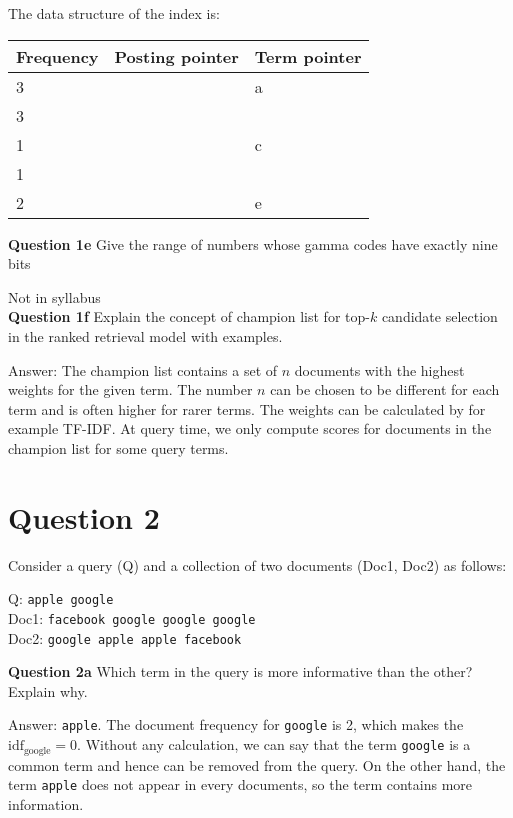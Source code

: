 \documentclass[11pt,a4paper]{report}
\begin{document}
\begin{multicols*}{2}
\noindent The data structure of the index is:

\begin{center}
\begin{tabular}{ | l | l | l |} 
    \hline
    Frequency & Posting pointer & Term pointer \\
    \hline
    3 & & a \\
    3 & & \\
    1 & & c \\
    1 & & \\
    2 & & e \\
    \hline
\end{tabular}
\end{center}

\noindent \textbf{Question 1e} Give the range of numbers whose gamma codes have exactly nine bits

\noindent Not in syllabus \\

\noindent \textbf{Question 1f} Explain the concept of champion list for top-$k$ candidate selection in the ranked retrieval model with examples. 

\noindent Answer: The champion list contains a set of $n$ documents with the highest weights for the given term. The number $n$ can be chosen to be different for each term and is often higher for rarer terms. The weights can be calculated by for example TF-IDF. At query time, we only compute scores for documents in the champion list for some query terms.

\section{Question 2}

\noindent Consider a query (Q) and a collection of two documents (Doc1, Doc2) as follows:

\begin{center}
Q: \verb|apple google|\\
Doc1: \verb|facebook google google google|\\
Doc2: \verb|google apple apple facebook|\\
\end{center}

\noindent \textbf{Question 2a} Which term in the query is more informative than the other? Explain why.

\noindent Answer: \verb|apple|. The document frequency for \verb|google| is 2, which makes the $\text{idf}_{\text{google}}=0$. Without any calculation, we can say that the term \verb|google| is a common term and hence can be removed from the query. On the other hand, the term \verb|apple| does not appear in every documents, so the term contains more information. 


\end{multicols*}
\end{document}
